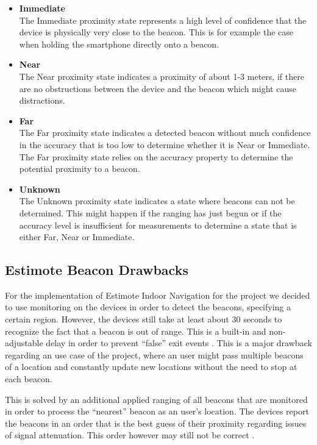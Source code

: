 \begin{itemize}

    \item \textbf{Immediate}\\
    The Immediate proximity state represents a high level of confidence that the device is physically very close to the beacon. This is for example the case when holding the smartphone directly onto a beacon.
    \item \textbf{Near}\\
    The Near proximity state indicates a proximity of about 1-3 meters, if there are no obstructions between the device and the beacon which might cause distractions.
    \item \textbf{Far}\\
    The Far proximity state indicates a detected beacon without much confidence in the accuracy that is too low to determine whether it is Near or Immediate. The Far proximity state relies on the accuracy property to determine the potential proximity to a beacon.
    \item \textbf{Unknown}\\
    The Unknown proximity state indicates a state where beacons can not be determined. This might happen if the ranging has just begun or if the accuracy level is insufficient for measurements to determine a state that is either Far, Near or Immediate.
\end{itemize}


\subsection{Estimote Beacon Drawbacks}

For the implementation of Estimote Indoor Navigation for the project we decided to use monitoring on the devices in order to detect the beacons, specifying a certain region. However, the devices still take at least about 30 seconds to recognize the fact that a beacon is out of range. This is a  built-in and non-adjustable delay in order to prevent \enquote{false} exit events \cite{Estimote}. This is a major drawback regarding an use case of the project, where an user might pass multiple beacons of a location and constantly update new locations without the need to stop at each beacon.

This is solved by an additional applied ranging of all beacons that are monitored in order to process the \enquote{nearest} beacon as an user's location. The devices report the beacons in an order that is the best guess of their proximity regarding issues of signal attenuation. This order however may still not be correct \cite{iBeacon}.


